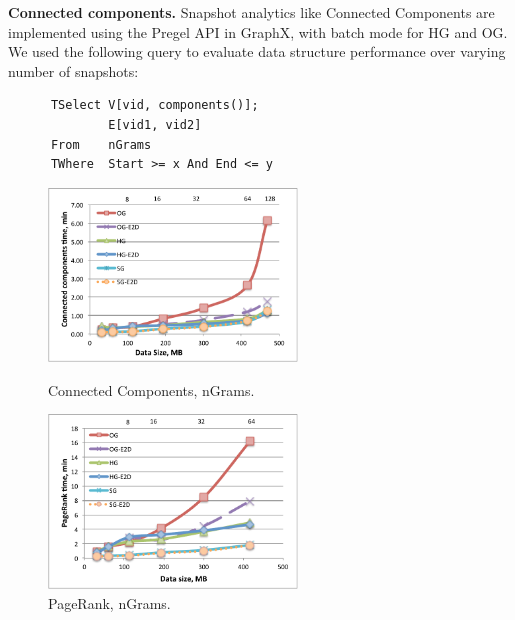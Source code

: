 
{\bf Connected components.} Snapshot analytics like Connected
  Components are implemented using the Pregel API in GraphX, with
  batch mode for HG and OG.  We used the following query to evaluate
  data structure performance over varying number of snapshots:

\begin{small}
\begin{verbatim}
      TSelect V[vid, components()];
              E[vid1, vid2]
      From    nGrams
      TWhere  Start >= x And End <= y
\end{verbatim}
\end{small}

\begin{figure}[t]
\centering
\begin{minipage}{3in}
  \centering
  \includegraphics[width=2.6in]{figs/connectedcs_ngrams.pdf}
  \vspace{-0.1in}
  \caption{Connected Components, nGrams.}
  \label{fig:connectc_ngrams}
  \vspace{-0.1in}
\end{minipage}
\begin{minipage}{3in}
  \centering
\includegraphics[width=2.6in]{figs/pagerank_ngrams.pdf}
  \vspace{-0.1in}
\caption{PageRank, nGrams.}
\label{fig:pagerank_ngrams}
  \vspace{-0.1in}
\end{minipage}
\end{figure}

